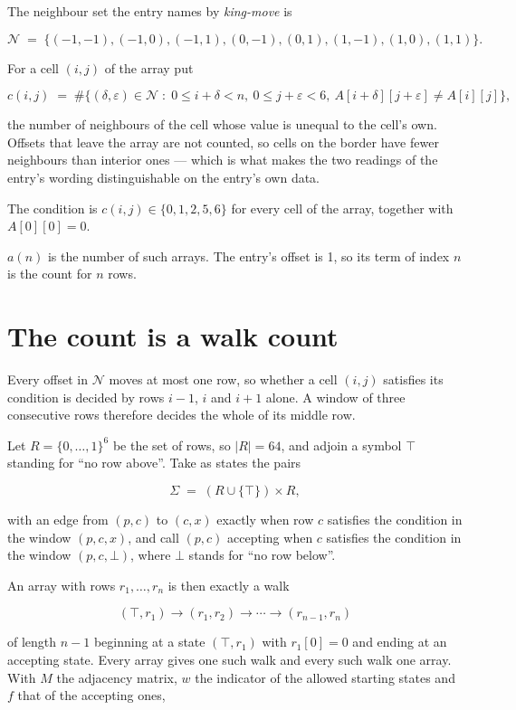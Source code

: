 \documentclass[11pt]{article}
\theoremstyle{definition}
\begin{document}
The neighbour set the entry names by {\itshape king-move} is

\[\mathcal{N} \;=\; \{(-1,-1), (-1,0), (-1,1), (0,-1), (0,1), (1,-1), (1,0), (1,1)\}.\]

For a cell $(i,j)$ of the array put

\[c(i,j) \;=\; \#\bigl\{(\delta,\varepsilon)\in\mathcal{N} \;:\; 0\le i+\delta<n,\ 0\le j+\varepsilon<6,\ A[i+\delta][j+\varepsilon] \neq A[i][j]\bigr\},\]

the number of neighbours of the cell whose value is unequal to the cell's own. Offsets that leave the array are not counted, so cells on the border have fewer neighbours than interior ones --- which is what makes the two readings of the entry's wording distinguishable on the entry's own data.

The condition is $c(i,j) \in \{0, 1, 2, 5, 6\}$ for every cell of the array, together with $A[0][0]=0$.

$a(n)$ is the number of such arrays. The entry's offset is 1, so its term of index $n$ is the count for $n$ rows.

\section{The count is a walk count}

Every offset in $\mathcal{N}$ moves at most one row, so whether a cell $(i,j)$ satisfies its condition is decided by rows $i-1$, $i$ and $i+1$ alone. A window of three consecutive rows therefore decides the whole of its middle row.

Let $R = \{0,\dots,1\}^{6}$ be the set of rows, so $|R| = 64$, and adjoin a symbol $\top$ standing for ``no row above''. Take as states the pairs

\[\Sigma \;=\; (R \cup \{\top\}) \times R,\]

with an edge from $(p,c)$ to $(c,x)$ exactly when row $c$ satisfies the condition in the window $(p,c,x)$, and call $(p,c)$ accepting when $c$ satisfies the condition in the window $(p,c,\bot)$, where $\bot$ stands for ``no row below''.

An array with rows $r_1,\dots,r_n$ is then exactly a walk

\[(\top,r_1) \to (r_1,r_2) \to \cdots \to (r_{n-1},r_n)\]

of length $n-1$ beginning at a state $(\top,r_1)$ with $r_1[0]=0$ and ending at an accepting state. Every array gives one such walk and every such walk one array. With $M$ the adjacency matrix, $w$ the indicator of the allowed starting states and $f$ that of the accepting ones,
\end{document}
